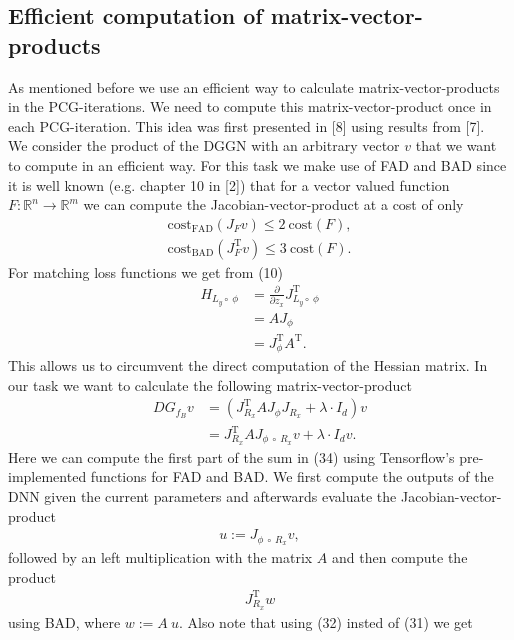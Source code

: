 \documentclass[conference]{IEEEtran}
\begin{document}
	\subsection{Efficient computation of matrix-vector-products}
	\noindent
	As mentioned before we use an efficient way to calculate matrix-vector-products in the PCG-iterations. We need to compute this matrix-vector-product once in each PCG-iteration. This idea was first presented in [8] using results from [7].\\
	We consider the product of the DGGN with an arbitrary vector $v$ that we want to compute in an efficient way.
	For this task we make use of FAD and BAD since it is well known (e.g. chapter 10 in [2]) that for a vector valued function $F:\mathbb{R}^{n}\rightarrow\mathbb{R}^{m}$ we can compute the Jacobian-vector-product at a cost of only
	\begin{align}
	\mathrm{cost}_{\text{FAD}}(J_{F}v)\leq 2\:\mathrm{cost}(F),\\
	\mathrm{cost}_{\text{BAD}}(J_{F}^{\mathrm{T}}v)\leq 3\:\mathrm{cost}(F).
	\end{align}
	For matching loss functions we get from (10)
	\begin{align}
	H_{L_{y}\circ\:\phi} &= \frac{\partial}{\partial z_{x}}J_{L_{y}\circ\:\phi}^{\mathrm{T}}\\
	&= AJ_{\phi} \\
	&= J_{\phi}^{\mathrm{T}}A^{\mathrm{T}}.
	\end{align}
	This allows us to circumvent the direct computation of the Hessian matrix. In our task we want to calculate the following matrix-vector-product
	\begin{align}
	DG_{f_{B}}v &=  \left(J_{R_{x}}^{\mathrm{T}}AJ_{\phi}J_{R_{x}} + \lambda\cdot I_{d}\right)v\\
	&= J_{R_{x}}^{\mathrm{T}}AJ_{\phi\:\circ\: R _{x}}v + \lambda\cdot I_{d}v.
	\end{align}
	Here we can compute the first part of the sum in (34) using Tensorflow's pre-implemented functions for FAD and BAD. We first compute the outputs of the DNN given the current parameters and afterwards evaluate the Jacobian-vector-product
	\begin{align}
	u := J_{\phi\:\circ\: R _{x}}v,
	\end{align}
	followed by an left multiplication with the matrix $A$ and then compute the product
	\begin{align}
	J_{R_{x}}^{\mathrm{T}}w
	\end{align}
	using BAD, where $w := A\:u$. Also note that using (32) insted of (31) we get
\end{document}

